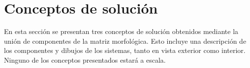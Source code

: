 \section{Conceptos de solución}
\label{Sec:CH03_CoS}
En esta sección se presentan tres conceptos de solución obtenidos mediante la unión de componentes de la matriz morfológica. Esto incluye una descripción de los componentes y dibujos de los sistemas, tanto en vista exterior como interior. Ninguno de los conceptos presentados estará a escala.

